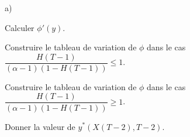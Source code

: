     

  \begin{noliste}{a)}
    \setcounter{enumi}{6}
    \setlength{\itemsep}{2mm}
    \item Calculer $\phi'(y)$.
    
    
    
    \item Construire le tableau de variation de $\phi$ dans le cas 
    $\dfrac{H(T-1)}{(\alpha-1)(1-H(T-1))} \leq 1$.
    
    
    
    \item Construire le tableau de variation de $\phi$ dans le cas 
    $\dfrac{H(T-1)}{(\alpha-1)(1-H(T-1))} \geq 1$.
    
    

    
    \item Donner la valeur de $y^*(X(T-2),T-2)$.
    
    
  \end{noliste}





